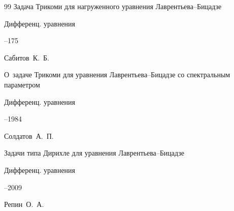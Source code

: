 \begin{thebibliography}{99}
\paper Задача Трикоми для нагруженного уравнения Лаврентьева--Бицадзе

\jour Дифференц. уравнения




--175







\by Сабитов~К.~Б.

\paper О~задаче Трикоми для уравнения Лаврентьева--Бицадзе со спектральным параметром

\jour Дифференц. уравнения




--1984






\by Солдатов~А.~П.

\paper Задачи типа Дирихле для уравнения Лаврентьева--Бицадзе

\jour Дифференц. уравнения




--2009












\by Репин~О.~А.


\end{thebibliography}
